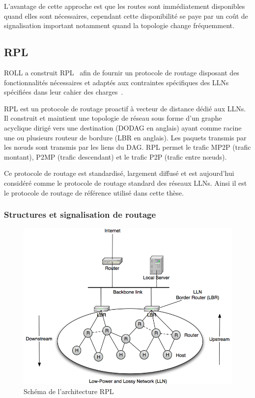 L'avantage de cette approche est que les routes sont immédiatement disponibles quand elles sont nécessaires, cependant cette disponibilité se paye par un coût de signalisation important notamment quand la topologie change fréquemment.

\subsection{\acl{RPL}}

\ac{ROLL} a construit \ac{RPL}~\cite{rfc6550} afin de fournir un protocole de routage disposant des fonctionnalités nécessaires et adaptés aux contraintes spécifiques des \ac{LLN}s spécifiées dans leur cahier des charges~\cite{draft-ietf-roll-protocols-survey-07}.

\ac{RPL} est un protocole de routage proactif à vecteur de distance dédié aux \ac{LLN}s.
Il construit et maintient une topologie de réseau sous forme d’un graphe acyclique dirigé vers une destination (\ac{DODAG} en anglais) ayant comme racine une ou plusieurs routeur de bordure (\ac{LBR} en anglais).
Les paquets transmis par les nœuds sont transmis par les liens du \ac{DAG}.
\ac{RPL} permet le trafic \ac{MP2P} (trafic montant), \ac{P2MP} (trafic descendant) et le trafic \ac{P2P} (trafic entre nœuds).

Ce protocole de routage est standardisé, largement diffusé et est aujourd'hui considéré comme le protocole de routage standard des réseaux \ac{LLN}s.
Ainsi il est le protocole de routage de référence utilisé dans cette thèse.

\subsubsection{Structures et signalisation de routage}

\begin{figure}[ht]
	\centering
	\includegraphics[width=.7\textwidth]{img/rpl.png}
	\caption{Schéma de l'architecture \ac{RPL}}
	\label{gw:fig:rpl_architecture}
\end{figure}

